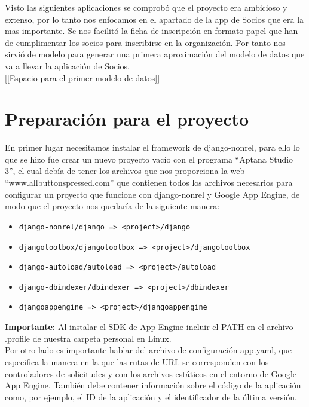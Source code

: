 Visto las siguientes aplicaciones se comprobó que el proyecto era ambicioso y extenso, 
por lo tanto nos enfocamos en el apartado de la app de Socios que era la mas importante. 
Se nos facilitó la ficha de inscripción en formato papel que han de cumplimentar los socios para inscribirse en la organización.
Por tanto nos sirvió de modelo para generar una primera aproximación del modelo de datos que va a llevar la aplicación de Socios.\\

[[Espacio para el primer modelo de datos]]

\section{Preparación para el proyecto}
\label{4:sec3}

En primer lugar necesitamos instalar el framework de django-nonrel, para ello lo que se hizo fue crear un nuevo proyecto vacío con el 
programa ``Aptana Studio 3'', el cual debía de tener los archivos que nos proporciona la web ``www.allbuttonspressed.com'' que contienen 
todos los archivos necesarios para configurar un proyecto que funcione con django-nonrel y Google App Engine, 
de modo que el proyecto nos quedaría de la siguiente manera:

\begin{itemize}
  \item \lstinline!django-nonrel/django => <project>/django!
  \item \lstinline!djangotoolbox/djangotoolbox => <project>/djangotoolbox!
  \item \lstinline!django-autoload/autoload => <project>/autoload!
  \item \lstinline!django-dbindexer/dbindexer => <project>/dbindexer!
  \item \lstinline!djangoappengine => <project>/djangoappengine!
\end{itemize}

\textbf{Importante:} Al instalar el SDK de App Engine incluir el PATH en el archivo .profile de nuestra carpeta personal en Linux.\\

Por otro lado es importante hablar del archivo de configuración app.yaml, que especifica la manera en la que las rutas de URL se corresponden con los 
controladores de solicitudes y con los archivos estáticos en el entorno de Google App Engine. 
También debe contener información sobre el código de la aplicación como, por ejemplo, el ID de la aplicación y el identificador de la última versión.\\

